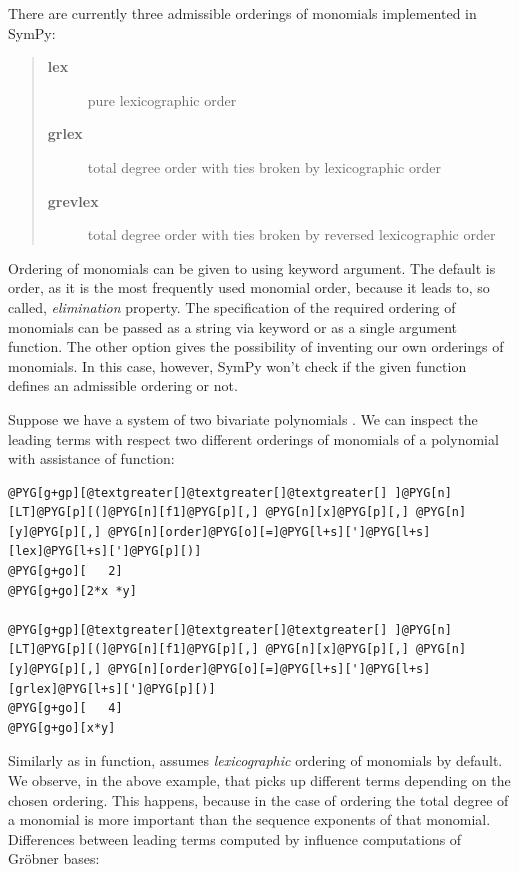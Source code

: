 There are currently three admissible orderings of monomials implemented in SymPy:
\begin{quote}
\begin{description}
\item[\textbf{lex}] \leavevmode
pure lexicographic order

\item[\textbf{grlex}] \leavevmode
total degree order with ties broken by lexicographic order

\item[\textbf{grevlex}] \leavevmode
total degree order with ties broken by reversed lexicographic order

\end{description}
\end{quote}

Ordering of monomials can be given to  using  keyword argument. The default
is  order, as it is the most frequently used monomial order, because it leads to, so called,
\emph{elimination} property. The specification of the required ordering of monomials can be passed as a
string via  keyword or as a single argument function. The other option gives the possibility
of inventing our own orderings of monomials. In this case, however, SymPy won't check if the given
function defines an admissible ordering or not.

Suppose we have a system of two bivariate polynomials .
We can inspect the leading terms with respect two different orderings of monomials of a polynomial with
assistance of  function:

\begin{Verbatim}[commandchars=@\[\]]
@PYG[g+gp][@textgreater[]@textgreater[]@textgreater[] ]@PYG[n][LT]@PYG[p][(]@PYG[n][f1]@PYG[p][,] @PYG[n][x]@PYG[p][,] @PYG[n][y]@PYG[p][,] @PYG[n][order]@PYG[o][=]@PYG[l+s][']@PYG[l+s][lex]@PYG[l+s][']@PYG[p][)]
@PYG[g+go][   2]
@PYG[g+go][2*x *y]

@PYG[g+gp][@textgreater[]@textgreater[]@textgreater[] ]@PYG[n][LT]@PYG[p][(]@PYG[n][f1]@PYG[p][,] @PYG[n][x]@PYG[p][,] @PYG[n][y]@PYG[p][,] @PYG[n][order]@PYG[o][=]@PYG[l+s][']@PYG[l+s][grlex]@PYG[l+s][']@PYG[p][)]
@PYG[g+go][   4]
@PYG[g+go][x*y]
\end{Verbatim}
\noindent
Similarly as in  function,  assumes \emph{lexicographic} ordering  of monomials by
default. We observe, in the above example, that  picks up different terms depending on the
chosen ordering. This happens, because in the case of  ordering the total degree of a monomial
is more important than the sequence exponents of that monomial. Differences between leading terms computed
by  influence computations of Gröbner bases:

